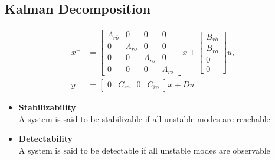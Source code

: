 \subsection{Kalman Decomposition}
\begin{align*}
    x^+ &= \begin{bmatrix}
        \Lambda_{r\overline{o}} & 0 & 0 & 0 \\
        0 & \Lambda_{ro} & 0 & 0 \\
        0 & 0 & \Lambda_{\overline{r}\overline{o}} & 0 \\
        0 & 0 & 0 & \Lambda_{\overline{r}o}
    \end{bmatrix} x + 
    \begin{bmatrix}
        B_{r\overline{o}} \\
        B_{ro} \\
        0 \\
        0
    \end{bmatrix} u, \\
    y &= \begin{bmatrix}
        0 & C_{ro} & 0 & C_{\overline{r}o}
    \end{bmatrix} x + Du
\end{align*}

\begin{itemize}
    \item \textbf{Stabilizability}\\
        A system is said to be stabilizable if all unstable modes are reachable

    \item \textbf{Detectability}\\
        A system is said to be detectable if all unstable modes are observable
\end{itemize}